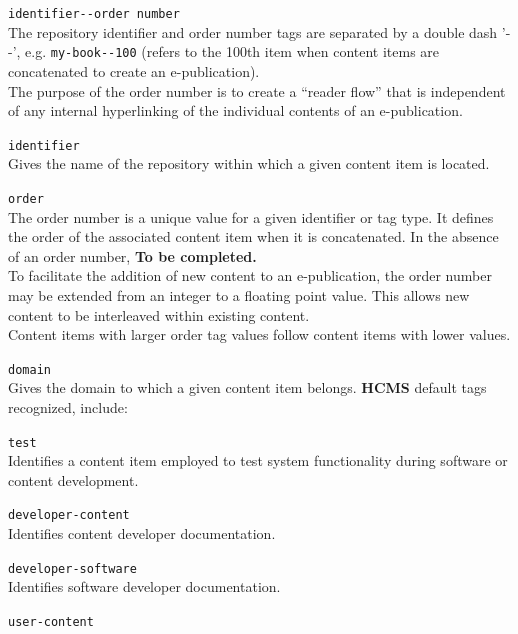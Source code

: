 \documentclass[12pt]{article}
\begin{document}
\begin{description}
\item {\tt identifier-{}-order number}\\
	The repository identifier and order number tags are separated by a double dash '-{}-', e.g. {\small \tt my-book-{}-100} (refers to the 100th item when content items are concatenated to create an e-publication).\\
	The purpose of the order number is to create a ``reader flow'' that is independent of any internal hyperlinking of the individual contents of an e-publication.
	\begin{description}
	\item {\tt identifier}\\
	Gives the name of the repository within which a given content item is located.
	\item {\tt order}\\
	The order number is a unique value for a given identifier or tag type. It defines the order of the associated content item when it is concatenated. In the absence of an order number, {\bf To be completed.}\\
	To facilitate the addition of new content to an e-publication, the order number may be extended from an integer to a floating point value. 	This allows new content to be interleaved within existing content.\\
	Content items with larger order tag values follow content items with lower  values.
	\end{description}
\item{\tt domain}\\
Gives the domain to which a given content item belongs. {\bf \small HCMS} default tags recognized, include:
	\begin{description}
	\item {\tt test}\\
	Identifies a content item employed to test system functionality during software or content development.
	\item {\tt developer-content}\\
	Identifies content developer documentation.
	\item {\tt developer-software}\\
	Identifies software developer documentation.
	\item {\tt user-content}\\

\end{description}
\end{description}
\end{document}
